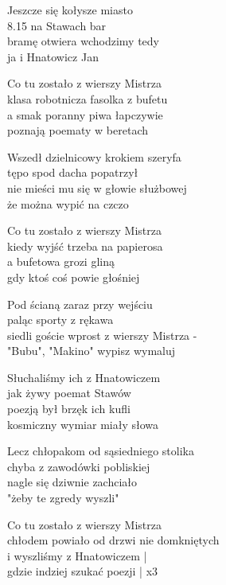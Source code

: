 
\begin{text}
    Jeszcze się kołysze miasto\\
    8.15 na Stawach bar\\
    bramę otwiera wchodzimy tedy\\
    ja i Hnatowicz Jan

    Co tu zostało z wierszy Mistrza\\
    klasa robotnicza fasolka z bufetu\\
    a smak poranny piwa łapczywie\\
    poznają poematy w beretach

    Wszedł dzielnicowy krokiem szeryfa\\
    tępo spod dacha popatrzył\\
    nie mieści mu się w głowie służbowej\\
    że można wypić na czczo

    Co tu zostało z wierszy Mistrza\\
    kiedy wyjść trzeba na papierosa\\
    a bufetowa grozi gliną\\
    gdy ktoś coś powie głośniej

    Pod ścianą zaraz przy wejściu\\
    paląc sporty z rękawa\\
    siedli goście wprost z wierszy Mistrza -\\
    "Bubu", "Makino" wypisz wymaluj

    Słuchaliśmy ich z Hnatowiczem\\
    jak żywy poemat Stawów\\
    poezją był brzęk ich kufli\\
    kosmiczny wymiar miały słowa

    Lecz chłopakom od sąsiedniego stolika\\
    chyba z zawodówki pobliskiej\\
    nagle się dziwnie zachciało\\
    "żeby te zgredy wyszli"

    Co tu zostało z wierszy Mistrza\\
    chłodem powiało od drzwi nie domkniętych\\
    i wyszliśmy z Hnatowiczem |\\
    gdzie indziej szukać poezji | x3
\end{text}
\begin{chord}

\end{chord}